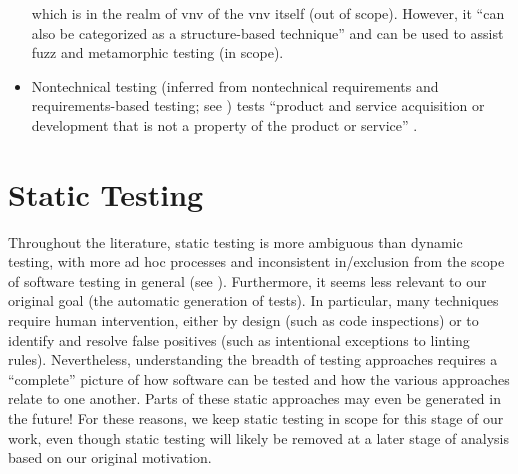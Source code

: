 \begin{itemize}
          which is in the realm of \acs{vnv} of the \acs{vnv} itself (out of
          scope). However, it ``can also be categorized as a structure-based
          technique'' and can be used to assist fuzz and metamorphic testing
          \citep[p.~5-15]{SWEBOK2024} (in scope).
          \ifnotpaper
    \item {}\label{nontech-req-test}
          Nontechnical testing (inferred from nontechnical requirements
          \citep[p.~293]{IEEE2017} and requirements-based testing; see
          ) tests ``product and service acquisition or
          development that is not a property of the product or service''
          \citep[p.~293]{IEEE2017}.
          \fi
\end{itemize}

\section{Static Testing}
\label{static-test}
Throughout the literature, static testing is more ambiguous than dynamic
testing, with more ad hoc processes and inconsistent in/exclusion from the
scope of software testing in general (see ).
Furthermore, it seems less relevant to our
original goal (the automatic generation of tests). In particular, many
techniques require human intervention, either by design (such as code
inspections) or to identify and resolve false positives (such as
intentional exceptions to linting rules). Nevertheless, understanding
the breadth of testing approaches requires a ``complete'' picture of how
software can be tested and how the various approaches relate to one another.
Parts of these static approaches may even be generated in the
future! For these reasons, we keep static testing in scope for this stage
of our work, even though static testing will likely be removed at a later
stage of analysis based on our original motivation.



